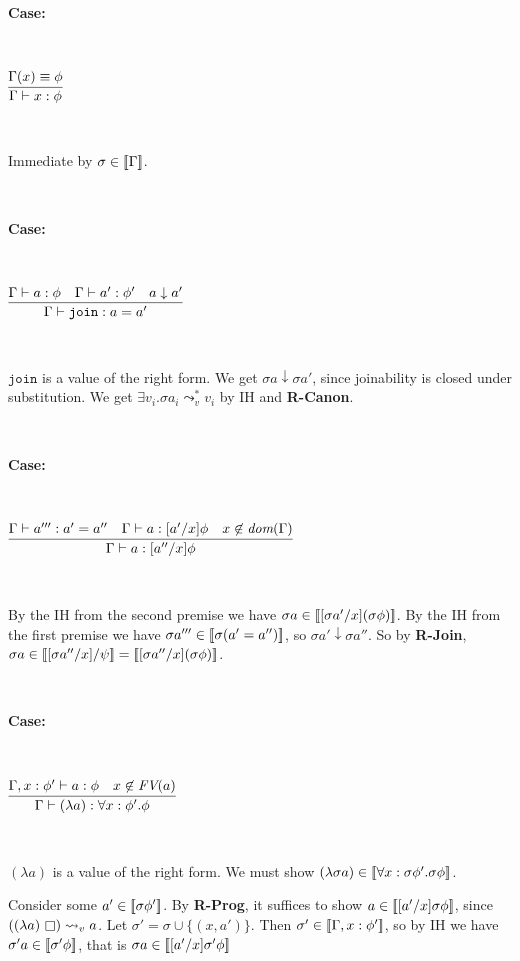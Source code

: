 \documentclass[copyright]{eptcs}
\newcommand{\join}[0]{\texttt{join}}
\newcommand{\leadstov}[0]{\leadsto_v}
\newcommand{\impapp}[0]{\raisebox{-0.2ex}{$\square$}}
\newcommand{\interp}[1]{[\negthinspace[#1]\negthinspace]}
\begin{document}
\ 

\noindent \textbf{Case:}

\

$\infer{\Gamma\vdash x:\phi}{\Gamma(x) \equiv \phi}$

\ 

\noindent Immediate by $\sigma \in \interp{\Gamma}$.

\ 

\noindent \textbf{Case:}

\

$\infer{\Gamma\vdash \join : a = a'}
{
  \Gamma\vdash a : \phi
& \Gamma\vdash a' : \phi'
& a \downarrow a'}$

\ 

\noindent $\join$ is a value of the right form. We get $\sigma a
\downarrow \sigma a'$, since joinability is closed under substitution.
We get $\exists v_i.\sigma a_i \leadstov^* v_i$ by IH and \textbf{R-Canon}.

\ 

\noindent \textbf{Case:}

\

$\infer{\Gamma\vdash a:[a''/x]\phi}
{\Gamma \vdash a''': a' = a'' & \Gamma \vdash a:[a'/x]\phi & x\not\in\textit{dom}(\Gamma)}$

\ 

\noindent By the IH from the second premise we have $\sigma
a\in\interp{[\sigma a'/x](\sigma\phi)}$.  By the IH from the first
premise we have $\sigma a''' \in \interp{\sigma(a'=a'')}$, so $\sigma
a' \downarrow \sigma a''$.  So by \textbf{R-Join}, $\sigma a \in \interp{[\sigma a''/x]/\psi} = \interp{[\sigma a''/x](\sigma\phi)}$.

\ 

\noindent \textbf{Case:}

\

$\infer{\Gamma \vdash (\lambda a) : \forall x:\phi'.\phi}
       {\Gamma, x:\phi' \vdash a:\phi & x\not\in\textit{FV}(a)}$

\ 

\noindent $(\lambda a)$ is a value of the right form. We must show
$(\lambda \sigma a) \in \interp{\forall x:\sigma\phi'.\sigma\phi}$.


Consider some $a' \in \interp{\sigma\phi'}$. By \textbf{R-Prog}, it
suffices to show $a \in \interp{[a'/x]\sigma\phi}$, since $((\lambda
a)\ \impapp)\leadstov a$.  Let $\sigma' = \sigma \cup \{(x,a')\}$. Then
$\sigma' \in \interp{\Gamma, x:\phi'}$, so by IH we have $\sigma' a
\in \interp{\sigma' \phi}$, that is $\sigma a \in
\interp{[a'/x]\sigma'\phi}$
\end{document}
